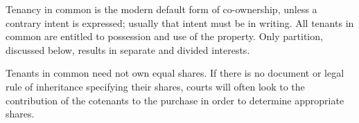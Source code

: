 Tenancy in common is the modern default form of co-ownership, unless a contrary
intent is expressed; usually that intent must be in writing.  All tenants in
common are entitled to possession and use of the property.  Only partition,
discussed below, results in separate and divided interests.

Tenants in common need not own equal shares.  If there is no document or legal
rule of inheritance specifying their shares, courts will often look to the
contribution of the cotenants to the purchase in order to determine appropriate
shares.

